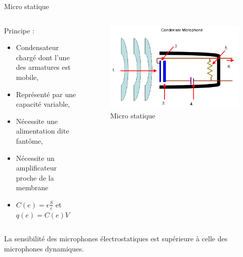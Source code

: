 \documentclass[aspectratio=169]{beamer}
\begin{document}
\begin{frame}{Micro statique}
\begin{columns}[t]\small
  \begin{column}{.5\textwidth}
  Principe :
  \begin{itemize}
	\item Condensateur chargé dont l'une des armatures est mobile,
	\item Représenté par une capacité variable,
	\item Nécessite une alimentation dite fantôme,
	\item Nécessite un amplificateur proche de la membrane
	\item $C(e)=\epsilon\frac{S}{e}$ et $q(e) = C(e) V$
  \end{itemize}
  \end{column}
  \begin{column}{.5\textwidth}
	\begin{figure}[!h]
	\begin{center}
	\includegraphics[width=.8\textwidth]{figure/Mic-condenser.png}
	\end{center}
	\caption{Micro statique}
	\end{figure}
  \end{column}
\end{columns}

La sensibilité des microphones électrostatiques est supérieure à celle des microphones dynamiques. 
\end{frame}
\end{document}
